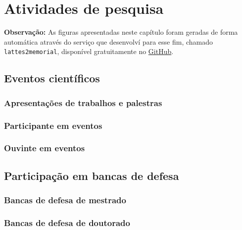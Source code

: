 
\chapter{Atividades de pesquisa}\label{cap:pesquisa}

\noindent
\textbf{Observação:} As figuras apresentadas neste capítulo foram geradas de forma automática através do serviço que desenvolví para esse fim, chamado \texttt{lattes2memorial}, disponível gratuitamente no \href{https://github.com/fzampirolli/lattes2memorial}{GitHub}.


\section{Eventos científicos}

\subsection{Apresentações de trabalhos e palestras}



\subsection{Participante em eventos}



\subsection{Ouvinte em eventos}



\section{Participação em bancas de defesa}

\subsection{Bancas de defesa de mestrado}



\subsection{Bancas de defesa de doutorado}



